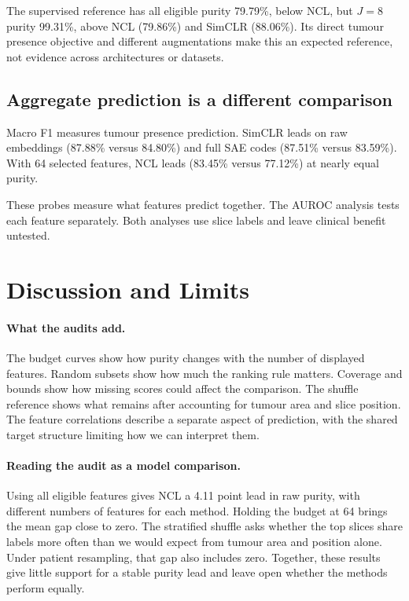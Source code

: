 \documentclass[letterpaper]{article}
\begin{document}
The supervised reference has all eligible purity 79.79\%, below NCL, but $J=8$ purity 99.31\%, above NCL (79.86\%) and SimCLR (88.06\%). Its direct tumour presence objective and different augmentations make this an expected reference, not evidence across architectures or datasets.

\subsection{Aggregate prediction is a different comparison}
Macro F1 measures tumour presence prediction. SimCLR leads on raw embeddings (87.88\% versus 84.80\%) and full SAE codes (87.51\% versus 83.59\%). With 64 selected features, NCL leads (83.45\% versus 77.12\%) at nearly equal purity.

These probes measure what features predict together. The AUROC analysis tests each feature separately. Both analyses use slice labels and leave clinical benefit untested.

\section{Discussion and Limits}
\paragraph{What the audits add.}
The budget curves show how purity changes with the number of displayed features. Random subsets show how much the ranking rule matters. Coverage and bounds show how missing scores could affect the comparison. The shuffle reference shows what remains after accounting for tumour area and slice position. The feature correlations describe a separate aspect of prediction, with the shared target structure limiting how we can interpret them.

\paragraph{Reading the audit as a model comparison.}
Using all eligible features gives NCL a 4.11 point lead in raw purity, with different numbers of features for each method. Holding the budget at 64 brings the mean gap close to zero. The stratified shuffle asks whether the top slices share labels more often than we would expect from tumour area and position alone. Under patient resampling, that gap also includes zero. Together, these results give little support for a stable purity lead and leave open whether the methods perform equally. 
\end{document}
